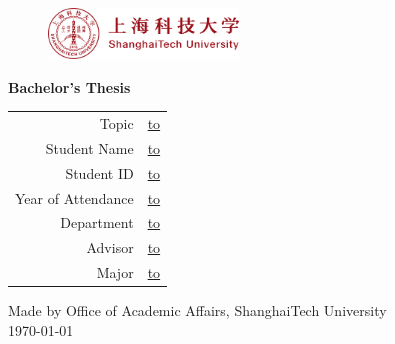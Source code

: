 \thispagestyle{empty}

\begin{figure}[!htb]
\includegraphics[width=0.45\textwidth]{style-files/emblem.pdf}
\end{figure}

\vspace{3cm}
\begin{center}
\Huge\sffamily\textbf{Bachelor's Thesis}
\end{center}
\vfill

\vspace{3cm}

{\def\arraystretch{1.5}
\makeatletter
  \begin{tabular}{Cc}
  Topic&
  \underline{\hbox to \@metaBlankLen{\hfill\@title\hfill}} \\
  Student Name&
  \underline{\hbox to \@metaBlankLen{\hfill\@studentNameEn\hfill}} \\
  Student ID&
  \underline{\hbox to \@metaBlankLen{\hfill\@studentId\hfill}} \\
  Year of Attendance&
  \underline{\hbox to \@metaBlankLen{\hfill\@yearOfAttendance\hfill}} \\
  Department&
  \underline{\hbox to \@metaBlankLen{\hfill\@departmentNameEn\hfill}} \\
  Advisor&
  \underline{\hbox to \@metaBlankLen{\hfill\@advisorNameEn\hfill}} \\
  Major&
  \underline{\hbox to \@metaBlankLen{\hfill\@majorNameEn\hfill}} \\
  \end{tabular}
\makeatother}

\vfill

\begin{center}
Made by Office of Academic Affairs, ShanghaiTech University\\
\today
\end{center}

\clearpage